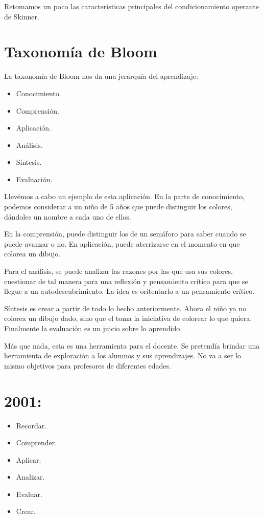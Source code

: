 \documentclass[12pt]{report}
\newcounter{it}
\theoremstyle{largebreak}
\begin{document}
    Retomamos un poco las características principales del condicionamiento operante de Skinner.

    \section{Taxonomía de Bloom}

    La taxonomía de Bloom nos da una jerarquía del aprendizaje:
    \begin{itemize}
        \item Conocimiento.
        \item Comprensión.
        \item Aplicación.
        \item Análisis.
        \item Síntesis.
        \item Evaluación.
    \end{itemize}

    Llevémos a cabo un ejemplo de esta aplicación. En la parte de conocimiento, podemos considerar a un niño de 5 años que puede distinguir los colores, dándoles un nombre a cada uno de ellos.

    En la comprensión, puede distinguir los de un semáforo para saber cuando se puede avanzar o no. En aplicación, puede aterrizarse en el momento en que colorea un dibujo.

    Para el análisis, se puede analizar las razones por las que usa sus colores, cuestionar de tal manera para una reflexión y pensamiento crítico para que se llegue a un autodescubrimiento. La idea es oritentarlo a un pensamiento crítico.

    Síntesis es crear a partir de todo lo hecho anteriormente. Ahora el niño ya no colorea un dibujo dado, sino que el toma la iniciativa de colorear lo que quiera. Finalmente la evaluación es un juicio sobre lo aprendido.

    Más que nada, esta es una herramienta para el docente. Se pretendía brindar una herramienta de exploración a los alumnos y sus aprendizajes. No va a ser lo mismo objetivos para profesores de diferentes edades.

    \section*{2001:}

    \begin{itemize}
        \item Recordar.
        \item Comprender.
        \item Aplicar.
        \item Analizar.
        \item Evaluar.
        \item Crear.
    \end{itemize}
\end{document}
